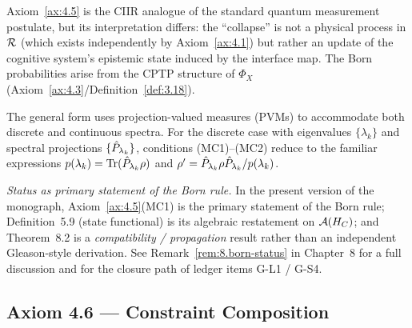 \begin{remark}
\label{rem:4.5}
Axiom~\ref{ax:4.5} is the CIIR analogue of the standard quantum
measurement postulate, but its interpretation differs: the ``collapse''
is not a physical process in $\mathcal{R}$ (which exists independently by
Axiom~\ref{ax:4.1}) but rather an update of the cognitive system's
epistemic state induced by the interface map.  The Born probabilities
arise from the CPTP structure of $\Phi_X$
(Axiom~\ref{ax:4.3}/Definition~\ref{def:3.18}).

The general form uses projection-valued measures (PVMs) to accommodate
both discrete and continuous spectra.  For the discrete case with
eigenvalues $\{\lambda_k\}$ and spectral projections
$\{\hat{P}_{\lambda_k}\}$, conditions (MC1)--(MC2) reduce to the
familiar expressions $p(\lambda_k) = \mathrm{Tr}(\hat{P}_{\lambda_k}\rho)$ and
$\rho' = \hat{P}_{\lambda_k}\rho\hat{P}_{\lambda_k}/p(\lambda_k)$.

\emph{Status as primary statement of the Born rule.}  In the present
version of the monograph, Axiom~\ref{ax:4.5}(MC1) is the primary
statement of the Born rule; Definition~5.9 (state functional) is its
algebraic restatement on $\mathcal{A}(H_C)$; and Theorem~8.2 is a
\emph{compatibility / propagation} result rather than an independent
Gleason-style derivation.  See Remark~\ref{rem:8.born-status} in
Chapter~8 for a full discussion and for the closure path of ledger
items G-L1 / G-S4.
\end{remark}

\subsection{Axiom 4.6 — Constraint Composition}
\label{sec:ch4:ax6}

